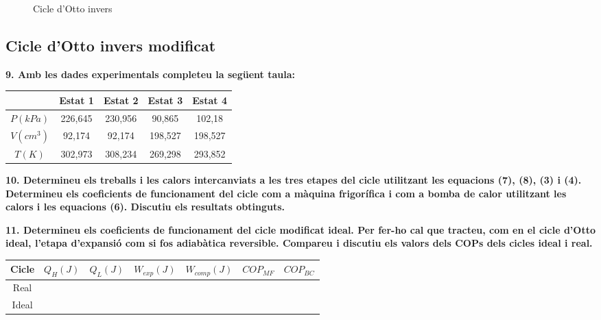 \documentclass[a4paper]{article}
\begin{document}
\begin{figure}[H]
    \centering
    \caption{Cicle d'Otto invers}
    \label{fig:cicle_otto_invers}
\end{figure}

\subsection*{Cicle d'Otto invers modificat}

\textbf{9. Amb les dades experimentals completeu la següent taula:}

\begin{tabular}{c|cccc}
    & Estat 1 & Estat 2 & Estat 3 & Estat 4 \\
    \hline
    $P(kPa)$ & 226,645 & 230,956 & 90,865 & 102,18 \\
    $V(cm^3)$ & 92,174 & 92,174 & 198,527 & 198,527 \\
    $T(K)$ & 302,973 & 308,234 & 269,298 & 293,852 \\
\end{tabular}

\textbf{10. Determineu els treballs i les calors intercanviats a les tres etapes del cicle utilitzant les equacions (7), (8), (3) i (4). Determineu els coeficients de funcionament del cicle com a màquina frigorífica i com a bomba de calor utilitzant les calors i les equacions (6). Discutiu els resultats obtinguts.}

\textbf{11. Determineu els coeficients de funcionament del cicle modificat ideal. Per fer-ho cal que tracteu, com en el cicle d'Otto ideal, l'etapa d'expansió com si fos adiabàtica reversible. Compareu i discutiu els valors dels COPs dels cicles ideal i real.}

\begin{tabular}{c|cccccc}
    Cicle & $Q_H(J)$ & $Q_L(J)$ & $W_{exp}(J)$ & $W_{comp}(J)$ & $COP_{MF}$ & $COP_{BC}$ \\
    \hline
    Real & & & & & & \\
    Ideal & & & & & &
\end{tabular}
\end{document}

